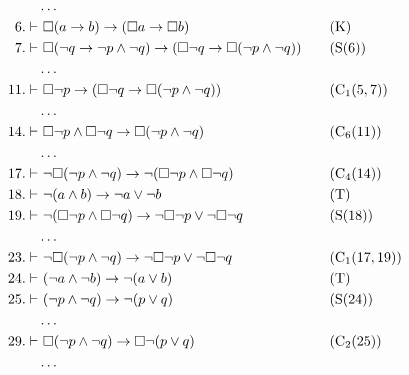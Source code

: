 \documentclass[a4paper, 12pt]{report}
\begin{document}
{{            \begin{equation*}
                \begin{alignedat}{2}
                    & \ldots && \\
                    6. \vdash & \ \Box (a \to b) \to (\Box a \to \Box b) && \quad \quad (\mbox{K}) \\
                    7. \vdash & \ \Box (\lnot q \to \lnot p \land \lnot q) \to (\Box \lnot q \to \Box (\lnot p \land \lnot q)) && \quad \quad (\mbox{S(6)}) \\
                              & \ldots && \\
                    11. \vdash & \ \Box \lnot p \to (\Box \lnot q \to \Box (\lnot p \land \lnot q)) && \quad \quad (\mbox{C}_1(5, 7)) \\
                               & \ldots && \\
                    14. \vdash & \ \Box \lnot p \land \Box \lnot q \to \Box (\lnot p \land \lnot q) && \quad \quad (\mbox{C}_6(11)) \\
                               & \ldots && \\
                    17. \vdash & \ \lnot \Box (\lnot p \land \lnot q) \to \lnot (\Box \lnot p \land \Box \lnot q) && \quad \quad (\mbox{C}_4(14)) \\
                    18. \vdash & \ \lnot (a \land b) \to \lnot a \lor \lnot b && \quad \quad (\mbox T) \\
                    19. \vdash & \ \lnot (\Box \lnot p \land \Box \lnot q) \to \lnot \Box \lnot p \lor \lnot \Box \lnot q && \quad \quad (\mbox{S(18)}) \\
                               & \ldots && \\
                    23. \vdash & \ \lnot \Box (\lnot p \land \lnot q) \to \lnot \Box \lnot p \lor \lnot \Box \lnot q && \quad \quad (\mbox{C}_1(17, 19)) \\
                    24. \vdash & \ (\lnot a \land \lnot b) \to \lnot (a \lor b) && \quad \quad (\mbox{T}) \\
                    25. \vdash & \ (\lnot p \land \lnot q) \to \lnot (p \lor q) && \quad \quad (\mbox{S(24)}) \\
                               & \ldots && \\
                    29. \vdash & \ \Box (\lnot p \land \lnot q) \to \Box \lnot (p \lor q) && \quad \quad (\mbox{C}_2(25)) \\
                               & \ldots && \\

\end{alignedat}
\end{equation*}}}
\end{document}
